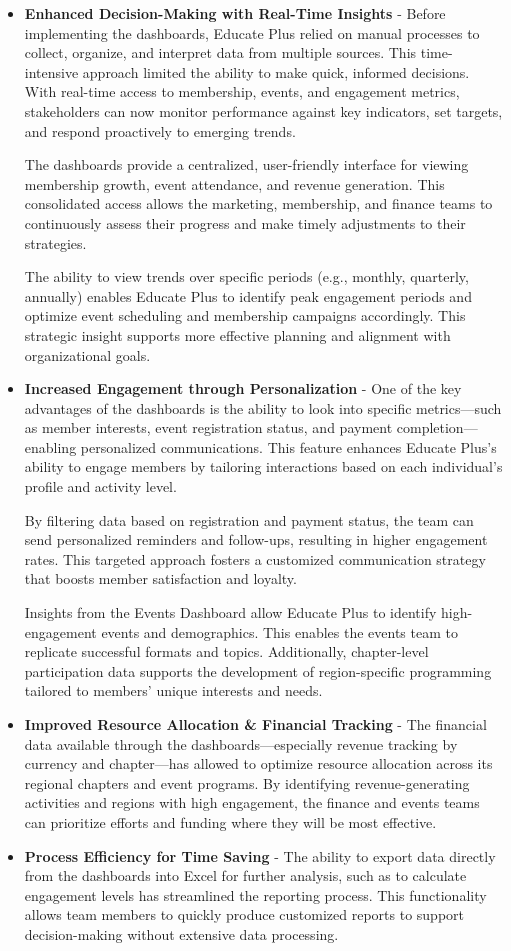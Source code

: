 \documentclass[11pt,a4paper,]{article}
\begin{document}
\begin{itemize}
\item
  \textbf{Enhanced Decision-Making with Real-Time Insights} - Before implementing the dashboards, Educate Plus relied on manual processes to collect, organize, and interpret data from multiple sources. This time-intensive approach limited the ability to make quick, informed decisions. With real-time access to membership, events, and engagement metrics, stakeholders can now monitor performance against key indicators, set targets, and respond proactively to emerging trends.

  The dashboards provide a centralized, user-friendly interface for viewing membership growth, event attendance, and revenue generation. This consolidated access allows the marketing, membership, and finance teams to continuously assess their progress and make timely adjustments to their strategies.

  The ability to view trends over specific periods (e.g., monthly, quarterly, annually) enables Educate Plus to identify peak engagement periods and optimize event scheduling and membership campaigns accordingly. This strategic insight supports more effective planning and alignment with organizational goals.
\item
  \textbf{Increased Engagement through Personalization} - One of the key advantages of the dashboards is the ability to look into specific metrics---such as member interests, event registration status, and payment completion---enabling personalized communications. This feature enhances Educate Plus's ability to engage members by tailoring interactions based on each individual's profile and activity level.

  By filtering data based on registration and payment status, the team can send personalized reminders and follow-ups, resulting in higher engagement rates. This targeted approach fosters a customized communication strategy that boosts member satisfaction and loyalty.

  Insights from the Events Dashboard allow Educate Plus to identify high-engagement events and demographics. This enables the events team to replicate successful formats and topics. Additionally, chapter-level participation data supports the development of region-specific programming tailored to members' unique interests and needs.
\item
  \textbf{Improved Resource Allocation \& Financial Tracking} - The financial data available through the dashboards---especially revenue tracking by currency and chapter---has allowed to optimize resource allocation across its regional chapters and event programs. By identifying revenue-generating activities and regions with high engagement, the finance and events teams can prioritize efforts and funding where they will be most effective.
\item
  \textbf{Process Efficiency for Time Saving} - The ability to export data directly from the dashboards into Excel for further analysis, such as to calculate engagement levels has streamlined the reporting process. This functionality allows team members to quickly produce customized reports to support decision-making without extensive data processing.


\end{itemize}
\end{document}
